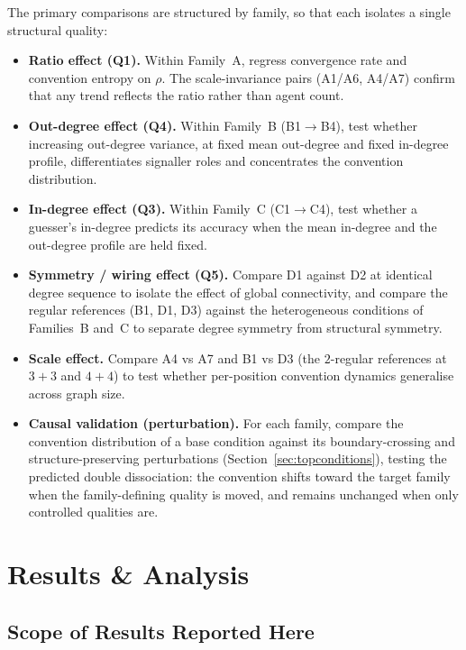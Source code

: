 \documentclass[a4paper,twoside,12pt]{report}
\begin{document}
    The primary comparisons are structured by family, so that each isolates a
    single structural quality:
    \begin{itemize}
        \item \textbf{Ratio effect (Q1).} Within Family~A, regress convergence
        rate and convention entropy on $\rho$. The scale-invariance pairs
        (A1/A6, A4/A7) confirm that any trend reflects the ratio rather than
        agent count.
        \item \textbf{Out-degree effect (Q4).} Within Family~B (B1$\to$B4),
        test whether increasing out-degree variance, at fixed mean out-degree
        and fixed in-degree profile, differentiates signaller roles and
        concentrates the convention distribution.
        \item \textbf{In-degree effect (Q3).} Within Family~C (C1$\to$C4),
        test whether a guesser's in-degree predicts its accuracy when the mean
        in-degree and the out-degree profile are held fixed.
        \item \textbf{Symmetry / wiring effect (Q5).} Compare D1 against D2 at
        identical degree sequence to isolate the effect of global connectivity,
        and compare the regular references (B1, D1, D3) against the
        heterogeneous conditions of Families~B and~C to separate degree
        symmetry from structural symmetry.
        \item \textbf{Scale effect.} Compare A4 vs A7 and B1 vs D3 (the
        $2$-regular references at $3{+}3$ and $4{+}4$) to test whether
        per-position convention dynamics generalise across graph size.
        \item \textbf{Causal validation (perturbation).} For each family, compare
        the convention distribution of a base condition against its
        boundary-crossing and structure-preserving perturbations
        (Section~\ref{sec:topconditions}), testing the predicted double
        dissociation: the convention shifts toward the target family when the
        family-defining quality is moved, and remains unchanged when only
        controlled qualities are.
    \end{itemize}
    
    
    
\chapter{Results \& Analysis}
\label{ch:results}

\section{Scope of Results Reported Here}
\label{sec:results-scope}
\end{document}
